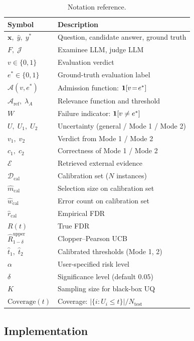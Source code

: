 \begin{table}[!ht]
\small
\centering
\caption{Notation reference.}
\label{tab:notation_full}
\begin{tabular}{@{}p{1.7cm}p{5.2cm}@{}}
\toprule
\textbf{Symbol} & \textbf{Description} \\
\midrule
$\mathbf{x},\; \hat{y},\; y^*$ & Question, candidate answer, ground truth \\
$F,\; \mathcal{J}$ & Examinee LLM, judge LLM \\
$v \in \{0,1\}$ & Evaluation verdict \\
$e^* \in \{0,1\}$ & Ground-truth evaluation label \\
$\mathcal{A}(v, e^*)$ & Admission function: $\mathbf{1}[v\!=\!e^*]$ \\
$\mathcal{A}_{\mathrm{ref}},\; \lambda_A$ & Relevance function and threshold \\
$W$ & Failure indicator: $\mathbf{1}[v \neq e^*]$ \\
$U,\; U_1,\; U_2$ & Uncertainty (general / Mode 1 / Mode 2) \\
$v_1,\; v_2$ & Verdict from Mode 1 / Mode 2 \\
$c_1,\; c_2$ & Correctness of Mode 1 / Mode 2 \\
$\mathcal{E}$ & Retrieved external evidence \\
$\mathcal{D}_{\mathrm{cal}}$ & Calibration set ($N$ instances) \\
$\hat{m}_{\mathrm{cal}}$ & Selection size on calibration set \\
$\hat{w}_{\mathrm{cal}}$ & Error count on calibration set \\
$\hat{r}_{\mathrm{cal}}$ & Empirical FDR \\
$R(t)$ & True FDR \\
$\hat{R}^{\mathrm{upper}}_{1-\delta}$ & Clopper--Pearson UCB \\
$\hat{t}_1,\; \hat{t}_2$ & Calibrated thresholds (Mode 1, 2) \\
$\alpha$ & User-specified risk level \\
$\delta$ & Significance level (default $0.05$) \\
$K$ & Sampling size for black-box UQ \\
$\mathrm{Coverage}(t)$ & Coverage: $|\{i : U_i \leq t\}| / N_{\mathrm{test}}$ \\
\bottomrule
\end{tabular}
\end{table}

\subsection{Implementation}
\label{app:implementation}


